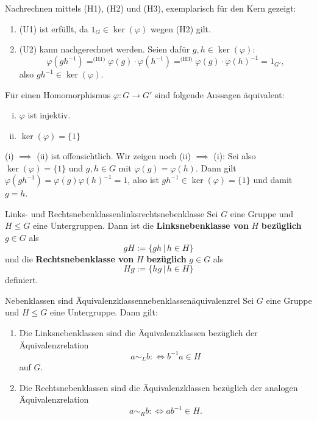 \begin{beweis}
Nachrechnen mittels (H1), (H2) und (H3), exemplarisch für den Kern gezeigt:
\begin{enumerate}
\item (U1) ist erfüllt, da $1_G \in \ker (\varphi)$ wegen (H2) gilt.
\item (U2) kann nachgerechnet werden. Seien dafür $g,h \in \ker (\varphi)$:
\begin{equation}
\varphi(gh^{-1}) =^{\text{(H1)}} \varphi(g) \cdot \varphi(h^{-1}) =^{\text{(H3)}} \varphi(g) \cdot \varphi(h)^{-1} = 1_{G'},
\end{equation}
also $gh^{-1} \in \ker (\varphi)$.
\end{enumerate}
\end{beweis}
\begin{satz}{}{}
Für einen Homomorphismus $\varphi: G \to G'$ sind folgende Aussagen äquivalent:
\begin{enumerate}[(i)]
\item $\varphi$ ist injektiv.
\item $\ker (\varphi) = \{1\}$
\end{enumerate}
\end{satz}
\begin{beweis}
(i) $\implies$ (ii) ist offensichtlich. Wir zeigen noch (ii) $\implies$ (i):
Sei also $\ker (\varphi) = \{1\}$ und $g,h \in G$ mit $\varphi(g) = \varphi(h)$. Dann gilt $\varphi(gh^{-1})=\varphi(g)\varphi(h)^{-1} =1$, also ist $gh^{-1} \in \ker (\varphi) = \{1\}$ und damit $g = h$.
\end{beweis}
\begin{definition}{Links- und Rechtsnebenklassen}{linksrechtsnebenklasse}
Sei $G$ eine Gruppe und $H \leq G$ eine Untergruppen. Dann ist die \textbf{Linksnebenklasse von} $H$ \textbf{bezüglich} $g \in G$ als 
\begin{equation}
gH := \{gh \, | \, h \in H\}
\end{equation}
und die \textbf{Rechtsnebenklasse von} $H$ \textbf{bezüglich} $g \in G$ als 
\begin{equation}
Hg := \{hg \, | \, h \in H \}
\end{equation}
definiert.
\end{definition}
\begin{satz}{Nebenklassen sind Äquivalenzklassen}{nebenklassenäquivalenzrel}
Sei $G$ eine Gruppe und $H \leq G$ eine Untergruppe. Dann gilt:
\begin{enumerate}
\item Die Linksnebenklassen sind die Äquivalenzklassen bezüglich der Äquivalenzrelation
\begin{equation}
a \sim_L b :\iff b^{-1}a \in H
\end{equation}
auf $G$.
\item Die Rechtsnebenklassen sind die Äquivalenzklassen bezüglich der analogen Äquivalenzrelation
\begin{equation}
a \sim_R b : \iff ab^{-1} \in H.
\end{equation}
\end{enumerate}
\end{satz}
